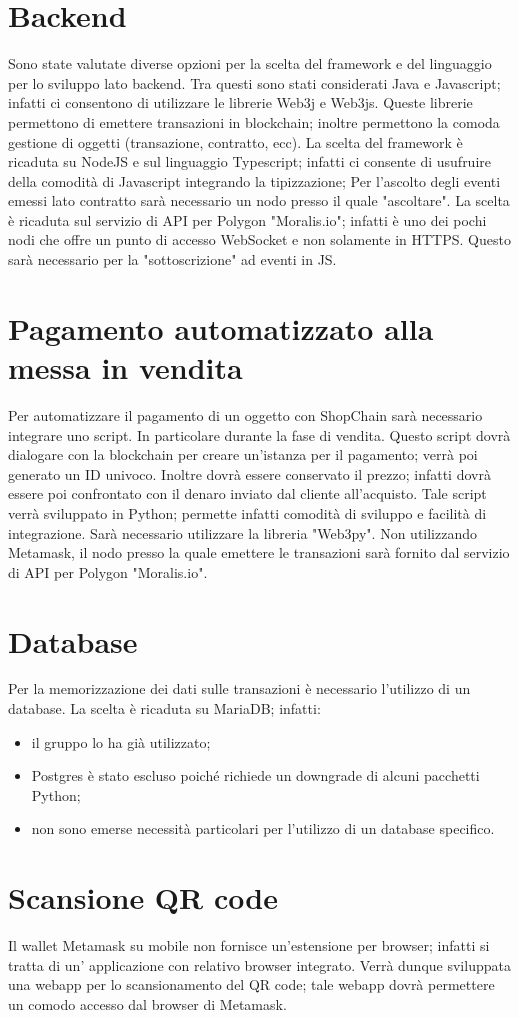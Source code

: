 \documentclass[a4paper, 12pt]{article}
\begin{document}
\section*{Backend}
Sono state valutate diverse opzioni per la scelta del framework e del linguaggio per lo sviluppo lato backend. Tra questi sono stati considerati Java e Javascript; infatti ci consentono di utilizzare le librerie Web3j e Web3js. Queste librerie permettono di emettere transazioni in blockchain; inoltre permettono la comoda gestione di oggetti (transazione, contratto, ecc).
La scelta del framework è ricaduta su NodeJS e sul linguaggio Typescript; infatti ci consente di usufruire della comodità di Javascript integrando la tipizzazione; Per l'ascolto degli eventi emessi lato contratto sarà necessario un nodo presso il quale "ascoltare". La scelta è ricaduta sul servizio di API per Polygon "Moralis.io"; infatti è uno dei pochi nodi che offre un punto di accesso WebSocket e non solamente in HTTPS. Questo sarà necessario per la "sottoscrizione" ad eventi in JS.

\section*{Pagamento automatizzato alla messa in vendita}
Per automatizzare il pagamento di un oggetto con ShopChain sarà necessario integrare uno script. In particolare durante la fase di vendita. Questo script dovrà dialogare con la blockchain per creare un'istanza per il pagamento; verrà poi generato un ID univoco. Inoltre dovrà essere conservato il prezzo; infatti dovrà essere poi confrontato con il denaro inviato dal cliente all'acquisto.
Tale script verrà sviluppato in Python; permette infatti comodità di sviluppo e facilità di integrazione. Sarà necessario utilizzare la libreria "Web3py". Non utilizzando Metamask, il nodo presso la quale emettere le transazioni sarà fornito dal servizio di API per Polygon "Moralis.io".

\section*{Database}
Per la memorizzazione dei dati sulle transazioni è necessario l'utilizzo di un database. La scelta è ricaduta su MariaDB; infatti:
\begin{itemize}
\item il gruppo lo ha già utilizzato;
\item Postgres è stato escluso poiché richiede un downgrade di alcuni pacchetti Python;
\item non sono emerse necessità particolari per l'utilizzo di un database specifico.
\end{itemize}

\section*{Scansione QR code}
Il wallet Metamask su mobile non fornisce un'estensione per browser; infatti si tratta di un' applicazione con relativo browser integrato. Verrà dunque sviluppata una webapp per lo scansionamento del QR code; tale webapp dovrà permettere un comodo accesso dal browser di Metamask.
\end{document}
